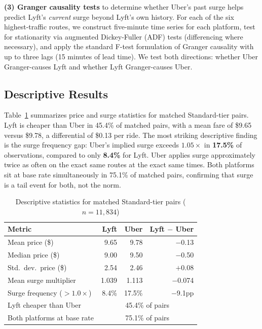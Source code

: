 \documentclass[11pt, letterpaper]{article}
\begin{document}
\textbf{(3) Granger causality tests} to determine whether Uber's past
surge helps predict Lyft's \textit{current} surge beyond Lyft's own
history. For each of the six highest-traffic routes, we construct
five-minute time series for each platform, test for stationarity via
augmented Dickey-Fuller (ADF) tests (differencing where necessary),
and apply the standard F-test formulation of Granger causality with
up to three lags (15 minutes of lead time). We test both directions:
whether Uber Granger-causes Lyft and whether Lyft Granger-causes Uber.

\subsection{Descriptive Results}

Table~\ref{tab:descriptive} summarizes price and surge statistics for
matched Standard-tier pairs. Lyft is cheaper than Uber in 45.4\% of
matched pairs, with a mean fare of \$9.65 versus \$9.78, a
differential of \$0.13 per ride. The most striking descriptive finding
is the surge frequency gap: Uber's implied surge exceeds $1.05\times$
in \textbf{17.5\%} of observations, compared to only \textbf{8.4\%}
for Lyft. Uber applies surge approximately twice as often on the
exact same routes at the exact same times. Both platforms sit at base
rate simultaneously in 75.1\% of matched pairs, confirming that surge
is a tail event for both, not the norm.

\begin{table}[H]
  \centering
  \caption{Descriptive statistics for matched Standard-tier pairs
           ($n = 11{,}834$)}
  \label{tab:descriptive}
  \begin{tabular}{lrrr}
    \toprule
    Metric & Lyft & Uber & Lyft $-$ Uber \\
    \midrule
    Mean price (\$)                      & 9.65  & 9.78  & $-$0.13 \\
    Median price (\$)                    & 9.00  & 9.50  & $-$0.50 \\
    Std.\ dev.\ price (\$)               & 2.54  & 2.46  & $+$0.08 \\
    Mean surge multiplier                & 1.039 & 1.113 & $-$0.074 \\
    Surge frequency ($> 1.0\times$)      & 8.4\% & 17.5\% & $-$9.1pp \\
    Lyft cheaper than Uber              &
      \multicolumn{3}{c}{45.4\% of pairs} \\
    Both platforms at base rate         &
      \multicolumn{3}{c}{75.1\% of pairs} \\
    \bottomrule
  \end{tabular}
\end{table}
\end{document}
